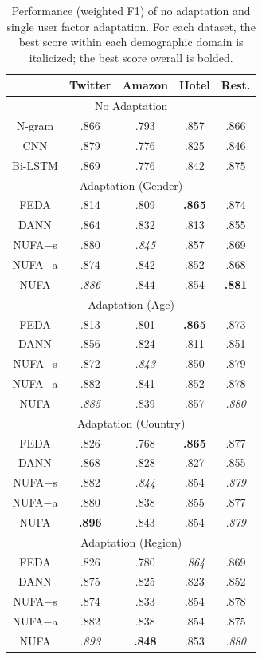 \begin{table}[t!]
\centering
\begin{tabular}{c|c|c|c|c}
 & Twitter & Amazon & Hotel & Rest. \\\hline
 \multicolumn{5}{c}{No Adaptation} \\\hline
N-gram & .866 & .793 & .857 & .866 \\
CNN & .879 & .776 & .825 & .846 \\
Bi-LSTM & .869 & .776 & .842 & .875 \\\hline
\multicolumn{5}{c}{Adaptation (Gender)} \\\hline
FEDA & .814 & .809 & \textbf{.865} & .874 \\
DANN & .864 & .832 & .813 & .855 \\ \hline
NUFA$-$s & .880 & \em .845 & .857 & .869 \\
NUFA$-$a & .874 & .842 & .852 & .868 \\
NUFA & \em .886 & .844 & .854 & \textbf{.881} \\ \hline
\multicolumn{5}{c}{Adaptation (Age)} \\\hline
FEDA & .813 & .801 & \bf .865 & .873 \\
DANN & .856 & .824 & .811 & .851 \\ \hline
NUFA$-$s & .872 & \em .843 & .850 & .879 \\
NUFA$-$a & .882 & .841 & .852 & .878 \\
NUFA & \em .885 & .839 & .857 & \em .880 \\ \hline
\multicolumn{5}{c}{Adaptation (Country)} \\\hline
FEDA & .826 & .768 & \bf .865 & .877 \\
DANN & .868 & .828 & .827 & .855 \\ \hline
NUFA$-$s & .882 & \em .844 & .854 & \em .879 \\
NUFA$-$a & .880 & .838 & .855 & .877 \\
NUFA & \textbf{.896} & .843 & .854 & \em .879 \\ \hline
\multicolumn{5}{c}{Adaptation (Region)} \\\hline
FEDA & .826 & .780 & \em .864 & .869 \\
DANN & .875 & .825 & .823 & .852 \\\hline
NUFA$-$s & .874 & .833 & .854 & .878 \\
NUFA$-$a & .882 & .838 & .854 & .875 \\
NUFA & \em .893 & \textbf{.848} & .853 & \em .880\\ \hline
\end{tabular}
\caption{Performance (weighted F1) of no adaptation and single user factor adaptation.
For each dataset, the best score within each demographic domain is italicized; the best score overall is bolded.
}
\label{chap4:table:single}
\end{table}

